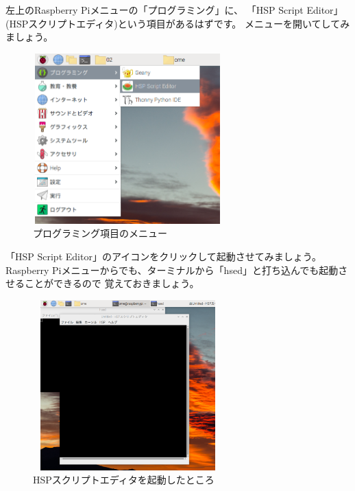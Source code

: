 左上のRaspberry Piメニューの「プログラミング」に、
「HSP Script Editor」(HSPスクリプトエディタ)という項目があるはずです。
メニューを開いてしてみましょう。

\begin{figure}[H]
  \begin{center}
    \includegraphics[keepaspectratio,width=7.31cm,height=6.562cm]{images/chap02/s_hspmenu.png}
    \caption{プログラミング項目のメニュー}
  \end{center}
  \label{fig:hsp_menu}
\end{figure}

「HSP Script Editor」のアイコンをクリックして起動させてみましょう。
Raspberry Piメニューからでも、ターミナルから「hsed」と打ち込んでも起動させることができるので
覚えておきましょう。

\begin{figure}[H]
  \begin{center}
    \includegraphics[keepaspectratio,width=7.31cm,height=6.562cm]{images/chap02/s_hsed.png}
    \caption{HSPスクリプトエディタを起動したところ}
  \end{center}
  \label{fig:hsed_start}
\end{figure}

